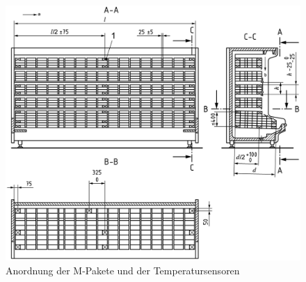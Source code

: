 \begin{figure}[h!tb]
\centering
\includegraphics[scale=.12]{Pictures/multi-deck-chilled-cabinet.pdf}
\caption{Anordnung der M-Pakete und der Temperatursensoren~\cite{DINDeutschesInstitutfurNormunge.V..}}
\label{fig:Anordnung der M-Pakete}
\end{figure}

